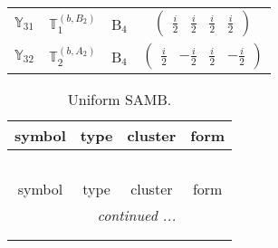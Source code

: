 \documentclass[fleqn,10pt,landscape]{article}
\begin{document}
\begin{itemize}
\begin{center}
\begin{longtable}{c|c|c|c}
$ \mathbb{Y}_{31} $ & $\mathbb{T}_{1}^{(b,B_{2})}$ & B$_{4}$ & $\begin{pmatrix} \frac{i}{2} & \frac{i}{2} & \frac{i}{2} & \frac{i}{2} \end{pmatrix}$ \\
$ \mathbb{Y}_{32} $ & $\mathbb{T}_{2}^{(b,A_{2})}$ & B$_{4}$ & $\begin{pmatrix} \frac{i}{2} & - \frac{i}{2} & \frac{i}{2} & - \frac{i}{2} \end{pmatrix}$ \\
\end{longtable}
\end{center}
\begin{center}
\renewcommand{\arraystretch}{1.3}
\begin{longtable}{c|c|c|c}
\caption{Uniform SAMB.}
 \\
 \hline \hline
symbol & type & cluster & form \\ \hline \endfirsthead

\multicolumn{3}{l}{\tablename\ \thetable{}} \\
 \hline \hline
symbol & type & cluster & form \\ \hline \endhead

 \hline \hline
\multicolumn{3}{r}{\footnotesize\it continued ...} \\ \endfoot

 \hline \hline
\multicolumn{3}{r}{} \\ \endlastfoot


\end{longtable}
\end{center}
\end{itemize}
\end{document}
